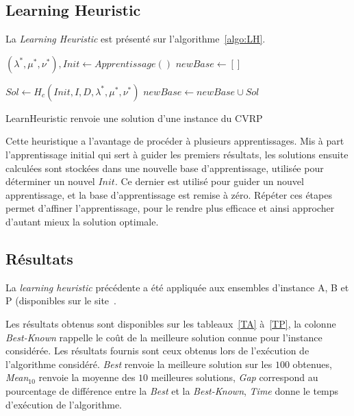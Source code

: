 \documentclass[a4paper,11pt]{article}%
\begin{document}
\subsection{Learning Heuristic}
La \emph{Learning Heuristic} est présenté sur l'algorithme~\ref{algo:LH}.

\begin{algorithm}
\DontPrintSemicolon %
$(\lambda^*,\mu^*,\nu^*), Init \gets Apprentissage()$\;
$newBase \gets []$\;
 {
	 {
		
		 {
			$Sol \gets H_c(Init,I,D,\lambda^*,\mu^*,\nu^*)$\;
			$newBase \gets newBase \cup Sol$\;
			}	
		
	}
}
\;
\caption{{\sc LearnHeuristic} renvoie une solution d'une instance du CVRP}
\label{algo:LH}
\end{algorithm}

Cette heuristique a l'avantage de procéder à plusieurs apprentissages. 
Mis à part l'apprentissage initial qui sert à guider les premiers résultats, les solutions ensuite calculées sont stockées dans une nouvelle base d'apprentissage, utilisée pour déterminer un nouvel $Init$.
Ce dernier est utilisé pour guider un nouvel apprentissage, et la base d'apprentissage est remise à zéro. 
Répéter ces étapes permet d'affiner l'apprentissage, pour le rendre plus efficace et ainsi approcher d'autant mieux la solution optimale.


\subsection{Résultats}

La \emph{learning heuristic} précédente a été appliquée aux ensembles d'instance A, B et P (disponibles sur le site~\cite{cvrplib}.

Les résultats obtenus sont disponibles sur les tableaux~\ref{TA} à~\ref{TP}, la colonne \emph{Best-Known} rappelle le coût de la meilleure solution connue pour l'instance considérée. 
Les résultats fournis sont ceux obtenus lors de l'exécution de l'algorithme considéré.
\emph{Best} renvoie la meilleure solution sur les $100$ obtenues, \emph{Mean$_{10}$} renvoie la moyenne des $10$ meilleures solutions, \emph{Gap} correspond au pourcentage de différence entre la \emph{Best} et la \emph{Best-Known}, \emph{Time} donne le temps d'exécution de l'algorithme.
\end{document}
